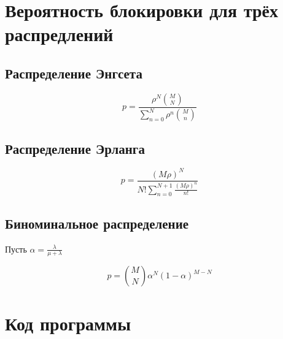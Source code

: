 \documentclass[12pt]{article}
\begin{document}
																																																							

\section{Вероятность блокировки для трёх распредлений}\label{sec:prob}


\subsection{Распределение Энгсета}\label{subsec:engset}

 \[
     p = \frac{\rho ^ N \binom{M}{N}}
     {\sum_{n=0}^{N} \rho ^ n \binom{M}{n}}
 \]

\subsection{Распределение Эрланга}\label{subsec:erlang}

\[
     p = \frac{(M \rho) ^ N}
     {N!\sum_{n=0}^{N + 1} \frac{(M \rho) ^ n}{n!}}
\]

\subsection{Биноминальное распределение}\label{subsec:binom}
Пусть $\alpha = \frac{\lambda}{\mu + \lambda}$

\[
     p = \binom{M}{N} \alpha ^ N (1 - \alpha) ^ {M - N}
\]

\section{Код программы}
\end{document}

